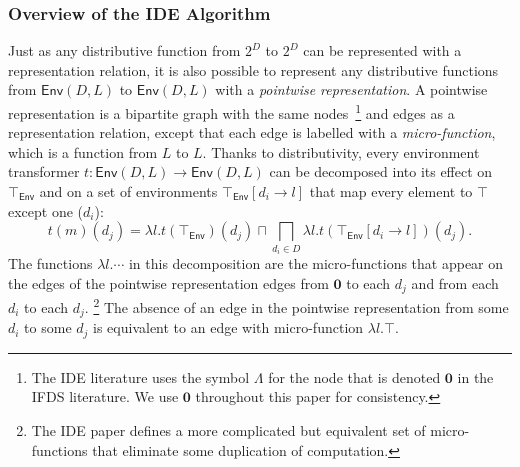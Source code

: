 \subsubsection{Overview of the IDE Algorithm}\label{sec:ideoverview}
Just as any distributive function from $2^D$ to $2^D$ can be represented with a
representation relation, it is also possible to represent any distributive functions from
$\textsf{Env}(D,L)$
to
$\textsf{Env}(D,L)$
with a \textit{pointwise representation}. A pointwise representation is a bipartite graph
with the same nodes~\footnote{The IDE literature uses the symbol $\Lambda$ for the node that
    is denoted $\mathbf0$ in the IFDS literature. We use $\mathbf0$ throughout this paper for consistency.}
and edges as a representation relation, except that each edge is labelled
with a \textit{micro-function}, which is a function from $L$ to $L$. 
Thanks to distributivity, every environment transformer 
$t : \textsf{Env}(D,L) \to \textsf{Env}(D,L)$
can be decomposed into its effect on $\top_{\textsf{Env}}$ and on a set of environments $\top_{\textsf{Env}}[d_i\to l]$
that map every element to $\top$ except one ($d_i$):
\[
    t(m)(d_j) = \lambda l. t(\top_{\textsf{Env}})(d_j) \sqcap \bigsqcap_{d_i\in D} \lambda l. t(\top_{\textsf{Env}}[d_i\to l])(d_j).
\]
The functions $\lambda l. \cdots$ in this decomposition are the micro-functions that
appear on the edges of the pointwise representation edges from $\mathbf0$ to each $d_j$ and from
each $d_i$ to each $d_j$.%
\footnote{The IDE paper defines a more complicated but equivalent set of micro-functions
that eliminate some duplication of computation.}
The absence of an edge in the pointwise representation from some $d_i$ to some $d_j$ is
equivalent to an edge with micro-function $\lambda l.\top$.

